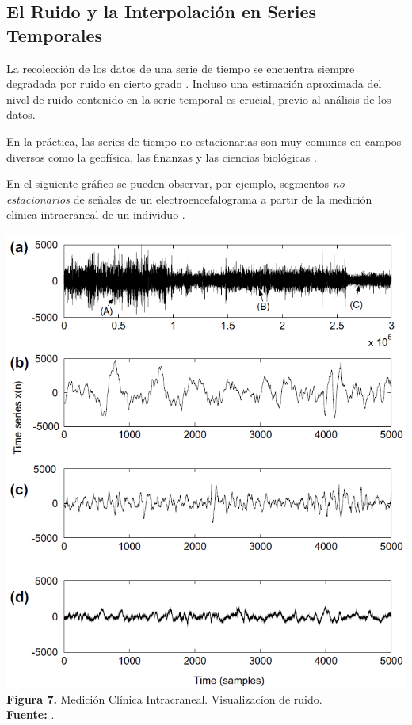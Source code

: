\subsection{El Ruido y la Interpolaci\'on en Series Temporales}
La recolecci\'on de los datos de una serie de tiempo se encuentra siempre degradada por ruido en cierto grado \cite{noise}. Incluso una estimaci\'on aproximada del nivel de ruido contenido en la serie temporal es crucial, previo al an\'alisis de los datos.\par
En la pr\'actica, las series de tiempo no estacionarias son muy comunes en campos diversos como la geof\'isica, las finanzas y las ciencias biol\'ogicas \cite{concepts}.\par
En el siguiente gr\'afico se pueden observar, por ejemplo, segmentos \textit{no estacionarios} de se\~nales de un electroencefalograma a partir de la medici\'on clinica intracraneal de un individuo \cite{noise}.
\begin{center}
\includegraphics[scale=0.7]{brainsignal.png}\\
\vspace*{10pt}
\footnotesize{\textbf{Figura 7.} Medici\'on Cl\'inica Intracraneal. Visualizac\'ion de ruido.}\\ \textbf{Fuente:} \cite{noise}.
\end{center}

